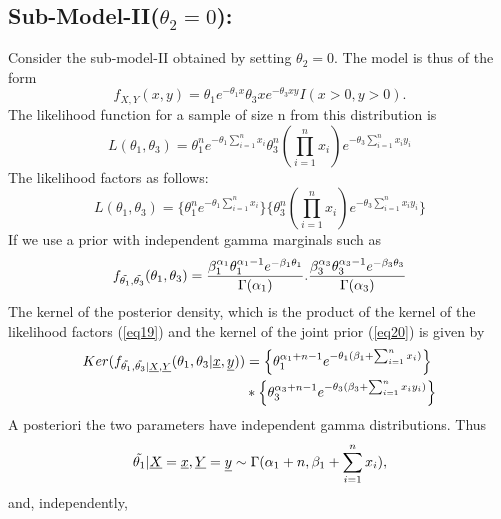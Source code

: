 \documentclass[12pt]{article}    %
\numberwithin{equation}{section}
\begin{document}
\subsection{Sub-Model-II($\theta_2=0$):}
Consider the sub-model-II obtained by setting $\theta_2=0$. The model is thus of the form
\begin{equation}\label{eq18}
f_{X,Y}(x,y) = \theta_1e^{-\theta_1x}\theta_3xe^{-\theta_3xy}I(x>0,y>0).
\end{equation}
The likelihood function for a sample of size n from this distribution is 
\begin{equation*}
L(\theta_1, \theta_3) = \theta_1^n e^{-\theta_1\sum^n_{i=1}x_i}\theta_3^n(\prod^n_{i=1}x_i) e^{-\theta_3\sum^n_{i=1}x_iy_i}
\end{equation*}
The likelihood factors as follows:
\begin{equation}\label{eq19}
L(\theta_1, \theta_3) = \Big \{ \theta_1^n e^{-\theta_1\sum^n_{i=1}x_i} \Big \} \Big \{\theta_3^n(\prod^n_{i=1}x_i) e^{-\theta_3\sum^n_{i=1}x_iy_i} \Big \}
\end{equation}
If we use a prior with independent gamma marginals such as
\begin{equation}\label{eq20}
f_{\Tilde{\theta_1},\Tilde{\theta_3}}(\theta_1,\theta_3) = \frac{\beta^{\alpha_1}_1\theta_1^{\alpha_1-1}e^{-\beta_1\theta_1}}{\Gamma(\alpha_1)}. \frac{\beta^{\alpha_3}_3\theta_3^{\alpha_3-1}e^{-\beta_3\theta_3}}{\Gamma(\alpha_3)}
\end{equation}
The kernel of the posterior density, which is the product of the kernel of the likelihood factors (\ref{eq19}) and the kernel of the joint prior (\ref{eq20}) is given by
\begin{equation}\label{eq21}
\begin{split}
Ker(f_{\Tilde{\theta_1},\Tilde{\theta_3}|\underline{X},\underline{Y}}(\theta_1,\theta_3|\underline{x},\underline{y})) & = \Big \{ \theta_1^{\alpha_1+n-1}e^{-\theta_1(\beta_1+\sum^n_{i=1}x_i)} \Big \} \\
& * \Big \{ \theta_3^{\alpha_3+n-1}e^{-\theta_3(\beta_3+\sum^n_{i=1}x_iy_i)} \Big \}
\end{split}
\end{equation}
A posteriori the two parameters have independent gamma distributions. Thus
\begin{equation}\label{eq22}
\Tilde{\theta_1}|\underline{X}=\underline{x},\underline{Y}=\underline{y} \sim \Gamma(\alpha_1+n, \beta_1+\sum^n_{i=1}{x_i}),
\end{equation}
and, independently, 
\end{document}
